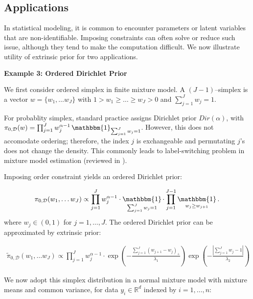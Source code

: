 \documentclass[10pt]{article}
\newcommand{\bb}[1]{\mathbb{#1}}
\newcommand{\mc}[1]{\mathcal{#1}}
\DeclareMathOperator{\1}{\mathbbm{1}}
\begin{document}
\subsection{Applications}

In statistical modeling, it is common to encounter parameters or latent variables that are non-identifiable. Imposing constraints can often solve or reduce such issue, although they tend to make the computation difficult. We now illustrate utility of extrinsic prior for two applications.  

{\bf Example 3: Ordered Dirichlet Prior}

We first consider ordered simplex in finite mixture model. A $(J-1)$--simplex is a vector $w=\{w_1,\ldots w_J\}$ with $1> w_1 \ge \ldots \ge w_J > 0$ and $\sum_{j=1}^J w_j=1$.

For probablity simplex, standard practice assigns Dirichlet prior $Dir(\alpha)$, with $
\pi_{0, \mc D}(w) = \prod_{j=1}^J w_j^{\alpha-1} \1_{\sum_{j=1}^J w_j=1}$. However, this does not accomodate ordering; therefore, the index $j$ is exchangeable and permutating $j$'s does not change the density. This commonly leads to label-switching problem in mixture model estimation (reviewed in \cite{jasra2005markov}).

Imposing order constraint yields an ordered Dirichlet prior:

 \begin{equation}
\begin{aligned}
\label{ordered_dp_prior}
\pi_{0, \mc D}(w_1,\ldots w_J) \propto \prod_{j=1}^J w_j^{\alpha-1} \cdot \1_{\sum_{j=1}^J w_j=1} \cdot  \prod_{j=1}^{J-1}\1_{w_j \ge w_{j+1}}.
\end{aligned}
\end{equation}
where $w_j\in (0,1)$ for $j=1,\ldots,J$. The ordered Dirichlet prior can be approximated by extrinsic prior:

 \begin{equation*}
\begin{aligned}
\tilde\pi_{0, \mc D}(w_1,\ldots w_J)  \propto \prod_{j=1}^J w_j^{\alpha-1} \cdot  \exp ( -  \frac{ \sum_{j=1}^J ( w_{j+1} - w_j )_+}{\lambda_1})
 \exp ( -  \frac{|{\sum_{j=1}^J w_j - 1}|}{\lambda_2})
\end{aligned}
\end{equation*}

We now adopt this simplex distribution in a normal mixture model with mixture means and common variance, for data $y_i\in \bb R^d$ indexed by $i=1,\ldots,n$:
\end{document}
